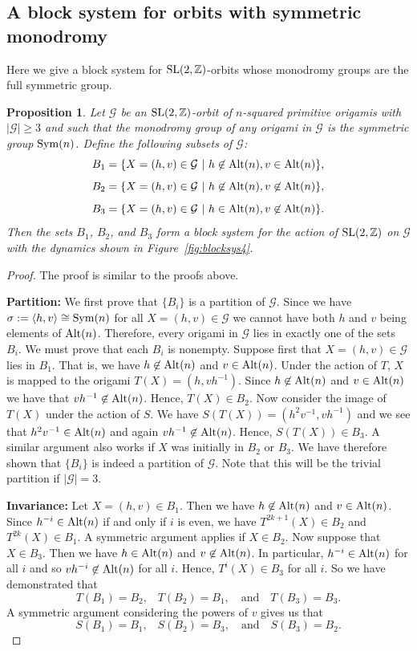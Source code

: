 \documentclass[a4paper,11pt]{amsart}
\numberwithin{equation}{section}
\numberwithin{figure}{section}
\numberwithin{table}{section}
\newtheorem{proposition}[theorem]{Proposition}
\newcommand{\Z}{\mathbb{Z}}
\newcommand{\orb}{\mathcal{G}}
\DeclareMathOperator{\SL}{{\rm{SL}}}
\DeclareMathOperator{\Sym}{{\rm{Sym}}}
\DeclareMathOperator{\Alt}{{\rm{Alt}}}
\begin{document}

\subsection{A block system for orbits with symmetric monodromy}

Here we give a block system for $\SL(2,\Z)$-orbits whose monodromy groups are the full symmetric group.

\begin{proposition}\label{prop:symblocksys}
Let $\orb$ be an $\SL(2,\Z)$-orbit of $n$-squared primitive origamis with $|\orb|\geq 3$ and such that the monodromy group of any origami in $\orb$ is the symmetric group $\Sym(n)$. Define the following subsets of $\orb$:
\[B_{1} = \{X = (h,v)\in \orb\,\,|\,\,h\not\in \Alt(n), v\in \Alt(n)\},\]
\[B_{2} = \{X = (h,v)\in \orb\,\,|\,\,h\not\in \Alt(n), v\not\in \Alt(n)\},\]
\[B_{3} = \{X = (h,v)\in \orb\,\,|\,\,h\in \Alt(n), v\not\in \Alt(n)\}.\]
Then the sets $B_{1}$, $B_{2}$, and $B_{3}$ form a block system for the action of $\SL(2,\Z)$ on $\orb$ with the dynamics shown in Figure~\ref{fig:blocksys4}.
\end{proposition}

\begin{proof}
The proof is similar to the proofs above.

{\bf Partition:} We first prove that $\{B_{i}\}$ is a partition of $\orb$. Since we have $\sigma:=\langle h, v\rangle\cong \Sym(n)$ for all $X = (h,v)\in \orb$ we cannot have both $h$ and $v$ being elements of $\Alt(n)$. Therefore, every origami in $\orb$ lies in exactly one of the sets $B_{i}$. We must prove that each $B_{i}$ is nonempty. Suppose first that $X = (h,v) \in \orb$ lies in $B_{1}$. That is, we have $h\not\in \Alt(n)$ and $v\in \Alt(n)$. Under the action of $T$, $X$ is mapped to the origami $T(X) = (h,vh^{-1})$. Since $h\not\in \Alt(n)$ and $v\in \Alt(n)$ we have that $vh^{-1}\not\in \Alt(n)$. Hence, $T(X) \in B_{2}$. Now consider the image of $T(X)$ under the action of $S$. We have $S(T(X)) = (h^2v^{-1},vh^{-1})$ and we see that $h^2v^{-1} \in \Alt(n)$ and again $vh^{-1}\not\in \Alt(n)$. Hence, $S(T(X)) \in B_{3}$. A similar argument also works if $X$ was initially in $B_{2}$ or $B_{3}$. We have therefore shown that $\{B_{i}\}$ is indeed a partition of $\orb$. Note that this will be the trivial partition if $|\orb| = 3$.

{\bf Invariance:} Let $X = (h,v) \in B_{1}$. Then we have $h\not\in \Alt(n)$ and $v\in \Alt(n)$. Since $h^{-i}\in \Alt(n)$ if and only if $i$ is even, we have $T^{2k+1}(X)\in B_{2}$ and $T^{2k}(X)\in B_{1}$. A symmetric argument applies if $X\in B_{2}$. Now suppose that $X\in B_{3}$. Then we have $h\in \Alt(n)$ and $v\not\in \Alt(n)$. In particular, $h^{-i}\in \Alt(n)$ for all $i$ and so $vh^{-i}\not\in \Alt(n)$ for all $i$. Hence, $T^{i}(X)\in B_{3}$ for all $i$. So we have demonstrated that
\[T(B_{1}) = B_{2}, \,\,\,\,\,T(B_{2}) = B_{1},\,\,\,\,\,\,\text{and}\,\,\,\,\,\,T(B_{3}) = B_{3}.\]
A symmetric argument considering the powers of $v$ gives us that 
\[S(B_{1}) = B_{1}, \,\,\,\,\,S(B_{2}) = B_{3},\,\,\,\,\,\,\text{and}\,\,\,\,\,\,S(B_{3}) = B_{2}.\]
\end{proof}
\end{document}
